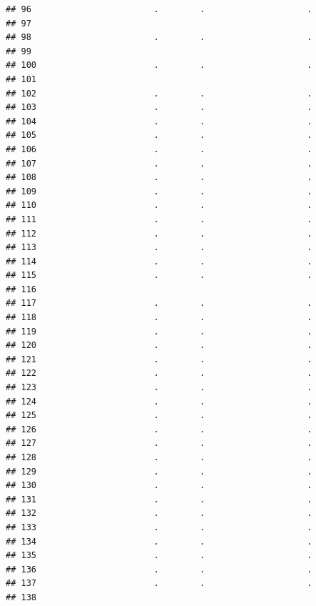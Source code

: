 \documentclass[
]{article}
\begin{document}
\begin{verbatim}
## 96                        .        .                    .
## 97                                                       
## 98                        .        .                    .
## 99                                                       
## 100                       .        .                    .
## 101                                                      
## 102                       .        .                    .
## 103                       .        .                    .
## 104                       .        .                    .
## 105                       .        .                    .
## 106                       .        .                    .
## 107                       .        .                    .
## 108                       .        .                    .
## 109                       .        .                    .
## 110                       .        .                    .
## 111                       .        .                    .
## 112                       .        .                    .
## 113                       .        .                    .
## 114                       .        .                    .
## 115                       .        .                    .
## 116                                                      
## 117                       .        .                    .
## 118                       .        .                    .
## 119                       .        .                    .
## 120                       .        .                    .
## 121                       .        .                    .
## 122                       .        .                    .
## 123                       .        .                    .
## 124                       .        .                    .
## 125                       .        .                    .
## 126                       .        .                    .
## 127                       .        .                    .
## 128                       .        .                    .
## 129                       .        .                    .
## 130                       .        .                    .
## 131                       .        .                    .
## 132                       .        .                    .
## 133                       .        .                    .
## 134                       .        .                    .
## 135                       .        .                    .
## 136                       .        .                    .
## 137                       .        .                    .
## 138                                                      

\end{verbatim}
\end{document}
